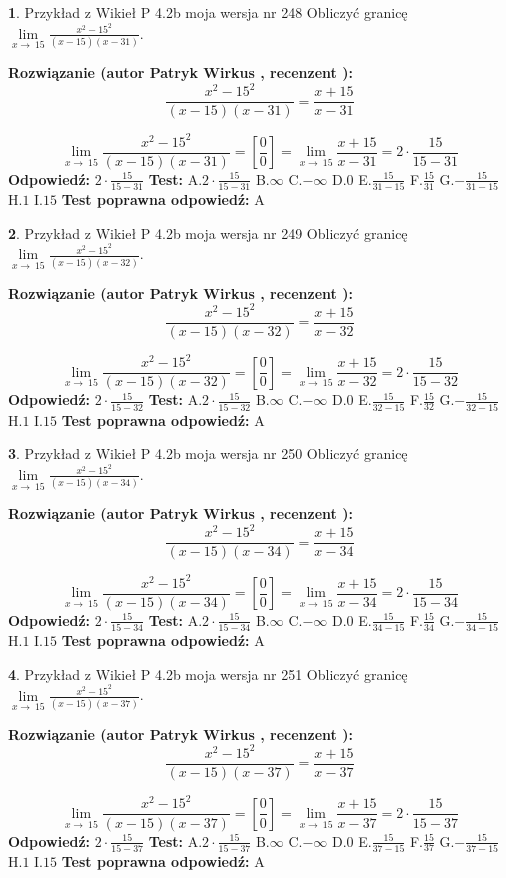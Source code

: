 \documentclass[12pt, a4paper]{article}
\theoremstyle{definition} %
\newtheorem{zad}{}
\newcommand{\zadStart}[1]{\begin{zad}#1\newline}
\newcommand{\zadStop}{\end{zad}}
\newcommand{\rozwStart}[2]{\noindent \textbf{Rozwiązanie (autor #1 , recenzent #2): }\newline}
\newcommand{\rozwStop}{\newline}
\newcommand{\odpStart}{\noindent \textbf{Odpowiedź:}\newline}
\newcommand{\odpStop}{\newline}
\newcommand{\testStart}{\noindent \textbf{Test:}\newline}
\newcommand{\testStop}{\newline}
\newcommand{\kluczStart}{\noindent \textbf{Test poprawna odpowiedź:}\newline}
\newcommand{\kluczStop}{\newline}
\begin{document}
\zadStart{Przykład z Wikieł P 4.2b moja wersja nr 248}
Obliczyć granicę $\lim\limits_{x\to\ 15}\frac{x^{2}-15^{2}}{(x-15)(x-31)}$.
\zadStop
\rozwStart{Patryk Wirkus}{}
$$\frac{x^{2}-15^{2}}{(x-15)(x-31)}=\frac{x+15}{x-31}$$

$$\lim\limits_{x\to\ 15}\frac{x^{2}-15^{2}}{(x-15)(x-31)}=[\frac{0}{0}]=\lim\limits_{x\to\ 15}\frac{x+15}{x-31}=2 \cdot \frac{15}{15-31}$$
\rozwStop
\odpStart
$2 \cdot \frac{15}{15-31}$
\odpStop
\testStart
A.$2 \cdot \frac{15}{15-31}$
B.$\infty$
C.$-\infty$
D.$0$
E.$\frac{15}{31-15}$
F.$\frac{15}{31}$
G.$-\frac{15}{31-15}$
H.$1$
I.$15$
\testStop
\kluczStart
A
\kluczStop



\zadStart{Przykład z Wikieł P 4.2b moja wersja nr 249}
Obliczyć granicę $\lim\limits_{x\to\ 15}\frac{x^{2}-15^{2}}{(x-15)(x-32)}$.
\zadStop
\rozwStart{Patryk Wirkus}{}
$$\frac{x^{2}-15^{2}}{(x-15)(x-32)}=\frac{x+15}{x-32}$$

$$\lim\limits_{x\to\ 15}\frac{x^{2}-15^{2}}{(x-15)(x-32)}=[\frac{0}{0}]=\lim\limits_{x\to\ 15}\frac{x+15}{x-32}=2 \cdot \frac{15}{15-32}$$
\rozwStop
\odpStart
$2 \cdot \frac{15}{15-32}$
\odpStop
\testStart
A.$2 \cdot \frac{15}{15-32}$
B.$\infty$
C.$-\infty$
D.$0$
E.$\frac{15}{32-15}$
F.$\frac{15}{32}$
G.$-\frac{15}{32-15}$
H.$1$
I.$15$
\testStop
\kluczStart
A
\kluczStop



\zadStart{Przykład z Wikieł P 4.2b moja wersja nr 250}
Obliczyć granicę $\lim\limits_{x\to\ 15}\frac{x^{2}-15^{2}}{(x-15)(x-34)}$.
\zadStop
\rozwStart{Patryk Wirkus}{}
$$\frac{x^{2}-15^{2}}{(x-15)(x-34)}=\frac{x+15}{x-34}$$

$$\lim\limits_{x\to\ 15}\frac{x^{2}-15^{2}}{(x-15)(x-34)}=[\frac{0}{0}]=\lim\limits_{x\to\ 15}\frac{x+15}{x-34}=2 \cdot \frac{15}{15-34}$$
\rozwStop
\odpStart
$2 \cdot \frac{15}{15-34}$
\odpStop
\testStart
A.$2 \cdot \frac{15}{15-34}$
B.$\infty$
C.$-\infty$
D.$0$
E.$\frac{15}{34-15}$
F.$\frac{15}{34}$
G.$-\frac{15}{34-15}$
H.$1$
I.$15$
\testStop
\kluczStart
A
\kluczStop



\zadStart{Przykład z Wikieł P 4.2b moja wersja nr 251}
Obliczyć granicę $\lim\limits_{x\to\ 15}\frac{x^{2}-15^{2}}{(x-15)(x-37)}$.
\zadStop
\rozwStart{Patryk Wirkus}{}
$$\frac{x^{2}-15^{2}}{(x-15)(x-37)}=\frac{x+15}{x-37}$$

$$\lim\limits_{x\to\ 15}\frac{x^{2}-15^{2}}{(x-15)(x-37)}=[\frac{0}{0}]=\lim\limits_{x\to\ 15}\frac{x+15}{x-37}=2 \cdot \frac{15}{15-37}$$
\rozwStop
\odpStart
$2 \cdot \frac{15}{15-37}$
\odpStop
\testStart
A.$2 \cdot \frac{15}{15-37}$
B.$\infty$
C.$-\infty$
D.$0$
E.$\frac{15}{37-15}$
F.$\frac{15}{37}$
G.$-\frac{15}{37-15}$
H.$1$
I.$15$
\testStop
\kluczStart
A
\kluczStop
\end{document}
